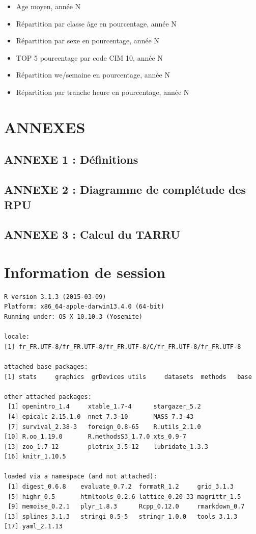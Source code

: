 \documentclass[]{article}
\begin{document}
\begin{itemize}
\itemsep1pt\parskip0pt
\item
  Age moyen, année N
\item
  Répartition par classe âge en pourcentage, année N
\item
  Répartition par sexe en pourcentage, année N
\item
  TOP 5 pourcentage par code CIM 10, année N
\item
  Répartition we/semaine en pourcentage, année N
\item
  Répartition par tranche heure en pourcentage, année N
\end{itemize}

\section{ANNEXES}\label{annexes}

\subsection{ANNEXE 1 : Définitions}\label{annexe-1-definitions}

\subsection{ANNEXE 2 : Diagramme de complétude des
RPU}\label{annexe-2-diagramme-de-completude-des-rpu}

\subsection{ANNEXE 3 : Calcul du TARRU}\label{annexe-3-calcul-du-tarru}

\section{Information de session}\label{information-de-session}

\begin{verbatim}
R version 3.1.3 (2015-03-09)
Platform: x86_64-apple-darwin13.4.0 (64-bit)
Running under: OS X 10.10.3 (Yosemite)

locale:
[1] fr_FR.UTF-8/fr_FR.UTF-8/fr_FR.UTF-8/C/fr_FR.UTF-8/fr_FR.UTF-8

attached base packages:
[1] stats     graphics  grDevices utils     datasets  methods   base     

other attached packages:
 [1] openintro_1.4     xtable_1.7-4      stargazer_5.2    
 [4] epicalc_2.15.1.0  nnet_7.3-10       MASS_7.3-43      
 [7] survival_2.38-3   foreign_0.8-65    R.utils_2.1.0    
[10] R.oo_1.19.0       R.methodsS3_1.7.0 xts_0.9-7        
[13] zoo_1.7-12        plotrix_3.5-12    lubridate_1.3.3  
[16] knitr_1.10.5     

loaded via a namespace (and not attached):
 [1] digest_0.6.8    evaluate_0.7.2  formatR_1.2     grid_3.1.3     
 [5] highr_0.5       htmltools_0.2.6 lattice_0.20-33 magrittr_1.5   
 [9] memoise_0.2.1   plyr_1.8.3      Rcpp_0.12.0     rmarkdown_0.7  
[13] splines_3.1.3   stringi_0.5-5   stringr_1.0.0   tools_3.1.3    
[17] yaml_2.1.13    
\end{verbatim}
\end{document}
